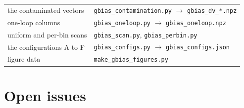 \documentclass[11pt]{article}
\begin{document}
\begin{center}
\begin{tabular}{ll}
    the contaminated vectors & \texttt{gbias\_contamination.py} $\rightarrow$ \texttt{gbias\_dv\_*.npz} \\
    one-loop columns & \texttt{gbias\_oneloop.py} $\rightarrow$ \texttt{gbias\_oneloop.npz} \\
    uniform and per-bin scans & \texttt{gbias\_scan.py}, \texttt{gbias\_perbin.py} \\
    the configurations A to F & \texttt{gbias\_configs.py} $\rightarrow$ \texttt{gbias\_configs.json} \\
    figure data & \texttt{make\_gbias\_figures.py} \\
    \bottomrule
  \end{tabular}
\end{center}

\section{Open issues}
\label{app:open}
\end{document}
